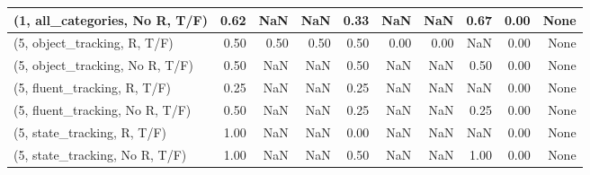 \begin{table*}[h!]
\begin{adjustbox}{width=2\columnwidth,center}
\begin{tabular}{lrrr|rrr|rrr}
(1, all\_categories, No R, T/F)       &                      0.62 &                   NaN &                       NaN &                          0.33 &                       NaN &                           NaN &                                   0.67 &                               0.00 &                                  None \\



\midrule
(5, object\_tracking, R, T/F)         &                      0.50 &                  0.50 &                      0.50 &                          0.50 &                      0.00 &                          0.00 &                                    NaN &                               0.00 &                                  None \\
(5, object\_tracking, No R, T/F)      &                      0.50 &                   NaN &                       NaN &                          0.50 &                       NaN &                           NaN &                                   0.50 &                               0.00 &                                  None \\
(5, fluent\_tracking, R, T/F)         &                      0.25 &                   NaN &                       NaN &                          0.25 &                       NaN &                           NaN &                                    NaN &                               0.00 &                                  None \\
(5, fluent\_tracking, No R, T/F)      &                      0.50 &                   NaN &                       NaN &                          0.25 &                       NaN &                           NaN &                                   0.25 &                               0.00 &                                  None \\
(5, state\_tracking, R, T/F)          &                      1.00 &                   NaN &                       NaN &                          0.00 &                       NaN &                           NaN &                                    NaN &                               0.00 &                                  None \\
(5, state\_tracking, No R, T/F)       &                      1.00 &                   NaN &                       NaN &                          0.50 &                       NaN &                           NaN &                                   1.00 &                               0.00 &                                  None \\

\end{tabular}
\end{adjustbox}
\end{table*}
